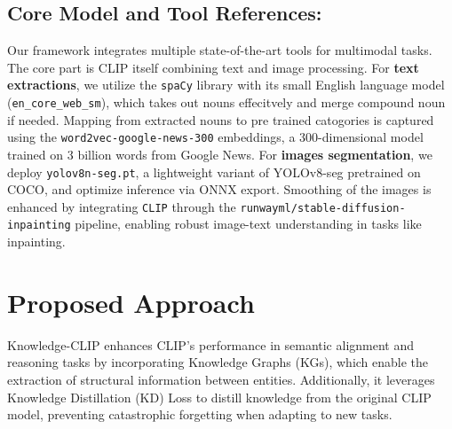 \documentclass[11pt,letterpaper]{article}
\begin{document}
\subsection{Core Model and Tool References:}
Our framework integrates multiple state-of-the-art tools for multimodal tasks. The core part is CLIP itself combining text and image processing.
For \textbf{text extractions}, we utilize the \texttt{spaCy} library with its small English language model (\texttt{en\_core\_web\_sm}), which takes out nouns effecitvely and merge compound noun if needed. 
Mapping from extracted nouns to pre trained catogories is captured using the \texttt{word2vec-google-news-300} embeddings, a 300-dimensional model trained on 3 billion words from Google News. 
For \textbf{images segmentation}, we deploy \texttt{yolov8n-seg.pt}, a lightweight variant of YOLOv8-seg pretrained on COCO, and optimize inference via ONNX export. Smoothing of the images is enhanced by integrating \texttt{CLIP} through the \texttt{runwayml/stable-diffusion-inpainting} pipeline, enabling robust image-text understanding in tasks like inpainting.
\section{Proposed Approach}
Knowledge-CLIP enhances CLIP's performance in semantic alignment and reasoning tasks by incorporating Knowledge Graphs (KGs), which enable the extraction of structural information between entities. Additionally, it leverages Knowledge Distillation (KD) Loss to distill knowledge from the original CLIP model, preventing catastrophic forgetting when adapting to new tasks.
\end{document}
